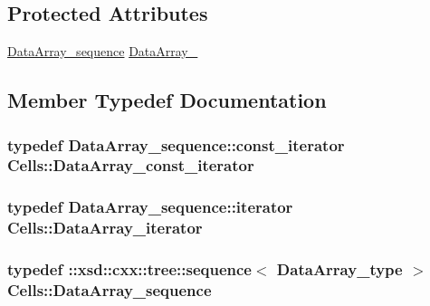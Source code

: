 \subsection*{Protected Attributes}
\begin{DoxyCompactItemize}
\item 
\hyperlink{classCells_ae2856ec1cc2c6d6a2ccac9de9a22c7b7}{Data\+Array\+\_\+sequence} \hyperlink{classCells_aad066678c1454f4afa408bcf4f24c583}{Data\+Array\+\_\+}
\end{DoxyCompactItemize}


\subsection{Member Typedef Documentation}
\subsubsection[{\texorpdfstring{Data\+Array\+\_\+const\+\_\+iterator}{DataArray_const_iterator}}]{\setlength{\rightskip}{0pt plus 5cm}typedef Data\+Array\+\_\+sequence\+::const\+\_\+iterator {\bf Cells\+::\+Data\+Array\+\_\+const\+\_\+iterator}}\hypertarget{classCells_ad01c81703074599471cd6159cdea1ac1}{}\label{classCells_ad01c81703074599471cd6159cdea1ac1}
\subsubsection[{\texorpdfstring{Data\+Array\+\_\+iterator}{DataArray_iterator}}]{\setlength{\rightskip}{0pt plus 5cm}typedef Data\+Array\+\_\+sequence\+::iterator {\bf Cells\+::\+Data\+Array\+\_\+iterator}}\hypertarget{classCells_a1873efdee2bb668676d01a7a5010faa2}{}\label{classCells_a1873efdee2bb668676d01a7a5010faa2}
\subsubsection[{\texorpdfstring{Data\+Array\+\_\+sequence}{DataArray_sequence}}]{\setlength{\rightskip}{0pt plus 5cm}typedef \+::xsd\+::cxx\+::tree\+::sequence$<$ {\bf Data\+Array\+\_\+type} $>$ {\bf Cells\+::\+Data\+Array\+\_\+sequence}}\hypertarget{classCells_ae2856ec1cc2c6d6a2ccac9de9a22c7b7}{}\label{classCells_ae2856ec1cc2c6d6a2ccac9de9a22c7b7}

